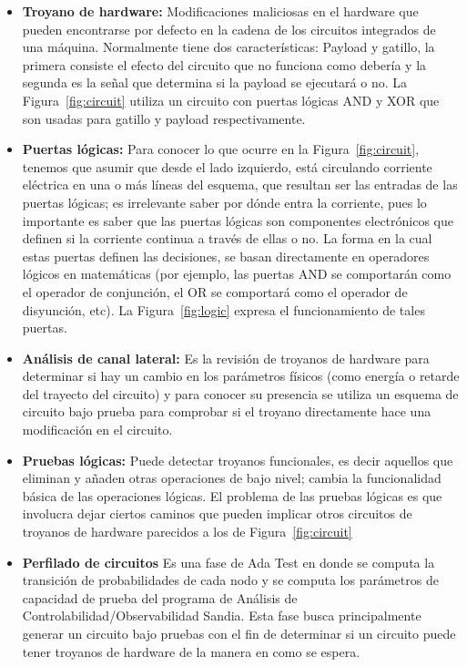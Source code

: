\begin{itemize}
  \item \textbf{Troyano de hardware:}
    Modificaciones maliciosas en el hardware que pueden encontrarse por defecto
    en la cadena de los circuitos integrados de una máquina. Normalmente tiene
    dos características: Payload y gatillo, la primera consiste el efecto del
    circuito que no funciona como debería y la segunda es la señal que determina
    si la payload se ejecutará o no. La Figura~\ref{fig:circuit} utiliza un
    circuito con puertas lógicas AND y XOR que son usadas para gatillo y
    payload respectivamente.

  \item \textbf{Puertas lógicas:}
    Para conocer lo que ocurre en la Figura~\ref{fig:circuit}, tenemos que
    asumir que desde el lado izquierdo, está circulando corriente eléctrica en
    una o más líneas del esquema, que resultan ser las entradas de las puertas
    lógicas; es irrelevante saber por dónde entra la corriente, pues lo
    importante es saber que las puertas lógicas son componentes electrónicos
    que definen si la corriente continua a través de ellas o no. La forma en la
    cual estas puertas definen las decisiones, se basan directamente en
    operadores lógicos en matemáticas (por ejemplo, las puertas AND se
    comportarán como el operador de conjunción, el OR se comportará como el
    operador de disyunción, etc). La Figura~\ref{fig:logic} expresa el
    funcionamiento de tales puertas.

  \item \textbf{Análisis de canal lateral:}
    Es la revisión de troyanos de hardware para determinar si hay un cambio en
    los parámetros físicos (como energía o retarde del trayecto del circuito)
    y para conocer su presencia se utiliza un esquema de circuito bajo prueba
    para comprobar si el troyano directamente hace una modificación en el
    circuito.

  \item \textbf{Pruebas lógicas:}
    Puede detectar troyanos funcionales, es decir aquellos que eliminan y añaden
    otras operaciones de bajo nivel; cambia la funcionalidad básica de las
    operaciones lógicas. El problema de las pruebas lógicas es que involucra
    dejar ciertos caminos que pueden implicar otros circuitos de troyanos de
    hardware parecidos a los de Figura~\ref{fig:circuit}

  \item \textbf{Perfilado de circuitos}
    Es una fase de Ada Test en donde se computa la transición de probabilidades
    de cada nodo y se computa los parámetros de capacidad de prueba del programa
    de Análisis de Controlabilidad/Observabilidad Sandia. Esta fase busca
    principalmente generar un circuito bajo pruebas con el fin de determinar si
    un circuito puede tener troyanos de hardware de la manera en como se espera.


\end{itemize}
